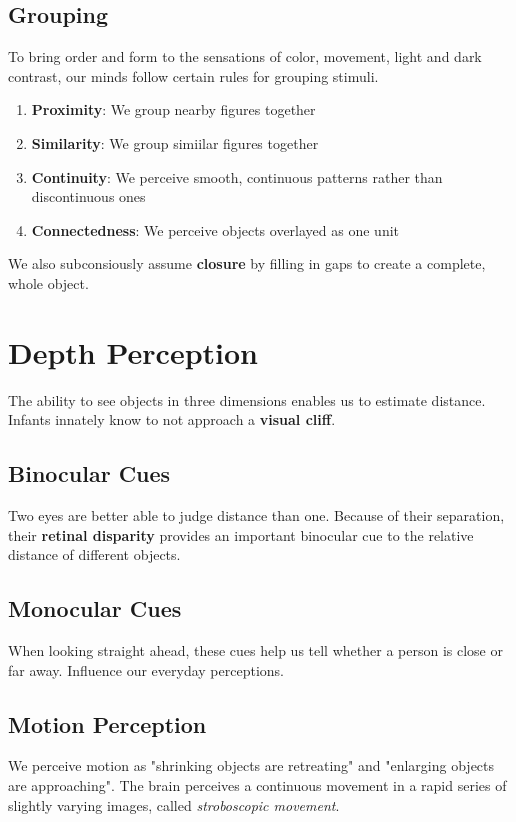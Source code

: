 \documentclass[12pt]{article}
\begin{document}
\subsection*{Grouping}
To bring order and form to the sensations of color, movement, light and dark contrast, our minds follow certain rules for grouping stimuli.

\begin{enumerate}
\item {\bf Proximity}: We group nearby figures together
\item {\bf Similarity}: We group simiilar figures together
\item {\bf Continuity}: We perceive smooth, continuous patterns rather than discontinuous ones
\item {\bf Connectedness}: We perceive objects overlayed as one unit
\end{enumerate}

We also subconsiously assume {\bf closure} by filling in gaps to create a complete, whole object.

\section*{Depth Perception}
The ability to see objects in three dimensions enables us to estimate distance. Infants innately know to not approach a \textbf{visual cliff}.

\subsection*{Binocular Cues}
Two eyes are better able to judge distance than one. Because of their separation, their \textbf{retinal disparity} provides an important binocular cue to the relative distance of different objects.

\subsection*{Monocular Cues}
When looking straight ahead, these cues help us tell whether a person is close or far away. Influence our everyday perceptions.

\subsection*{Motion Perception}
We perceive motion as "shrinking objects are retreating" and "enlarging objects are approaching". The brain perceives a continuous movement in a rapid series of slightly varying images, called \textit{stroboscopic movement}.
\end{document}
